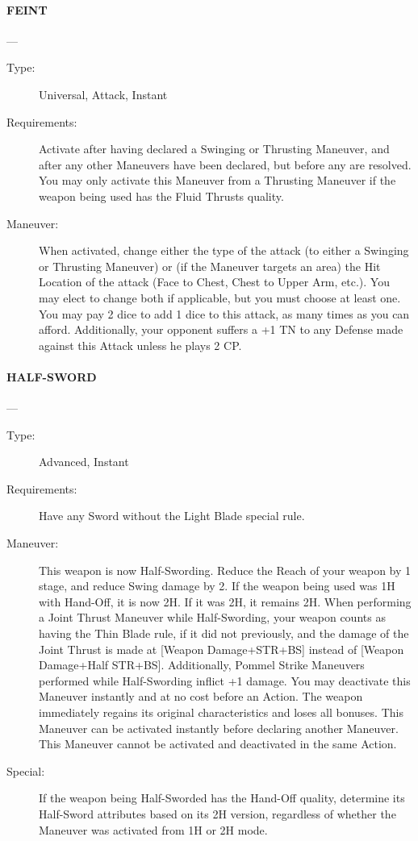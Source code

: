 \documentclass[oneside,11pt,english]{book}
\begin{document}
\paragraph{\large\label{man:FEINT} FEINT}---\quad{\large[2+Variable]}
\vspace{-10pt}\begin{description} 
\item [Type:] Universal, Attack, Instant 
\item [Requirements:] Activate after having declared a Swinging or Thrusting Maneuver, and after any other Maneuvers have been declared, but before any are resolved. You may only activate this Maneuver from a Thrusting Maneuver if the weapon being used has the Fluid Thrusts quality. 
\item [Maneuver:] When activated, change either the type of the attack (to either a Swinging or Thrusting Maneuver) or (if the Maneuver targets an area) the Hit Location of the attack (Face to Chest, Chest to Upper Arm, etc.). You may elect to change both if applicable, but you must choose at least one. You may pay 2 dice to add 1 dice to this attack, as many times as you can afford. Additionally, your opponent suffers a +1 TN to any Defense made against this Attack unless he plays 2 CP.
\end{description}

\paragraph{\large\label{man:HALF-SWORD} HALF-SWORD}---\quad{\large[1]}
\vspace{-10pt}\begin{description} 
\item [Type:] Advanced, Instant 
\item [Requirements:] Have any Sword without the Light Blade special rule. 
\item [Maneuver:] This weapon is now Half-Swording. Reduce the Reach of your weapon by 1 stage, and reduce Swing damage by 2. If the weapon being used was 1H with Hand-Off, it is now 2H. If it was 2H, it remains 2H. When performing a Joint Thrust Maneuver while Half-Swording, your weapon counts as having the Thin Blade rule, if it did not previously, and the damage of the Joint Thrust is made at [Weapon Damage+STR+BS] instead of [Weapon Damage+Half STR+BS]. Additionally, Pommel Strike Maneuvers performed while Half-Swording inflict +1 damage. You may deactivate this Maneuver instantly and at no cost before an Action. The weapon immediately regains its original characteristics and loses all bonuses. This Maneuver can be activated instantly before declaring another Maneuver. This Maneuver cannot be activated and deactivated in the same Action.
\item [Special:] If the weapon being Half-Sworded has the Hand-Off quality, determine its Half-Sword attributes 
based on its 2H version, regardless of whether the Maneuver was activated from 1H or 2H mode. 
\end{description}
\end{document}
